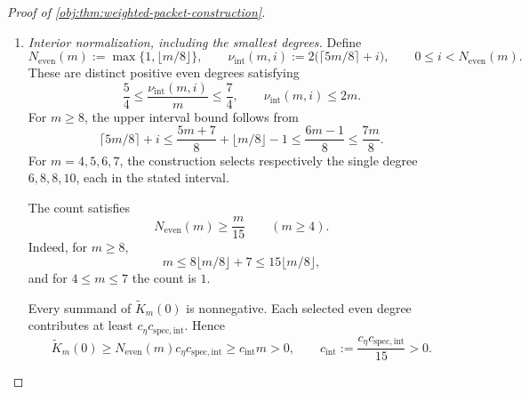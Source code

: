 \documentclass[11pt]{article}
\begin{document}
\begin{proof}[Proof of \cref{obj:thm:weighted-packet-construction}]
\begin{enumerate}
The binomial representation in \cref{obj:lem:jacobi-binomial}, evaluated at zero, gives
\[
\mathsf J_{2s}^{(4,4)}(0)
=
4^{-s}
\sum_{i=0}^{2s}
\binom{2s+4}{i}\binom{2s+4}{2s-i}(-1)^{2s-i}.
\]
The sum is the coefficient of degree \(2s\) in
\((1+z)^{2s+4}(1-z)^{2s+4}=(1-z^2)^{2s+4}\). Therefore
\[
\mathsf J_{2s}^{(4,4)}(0)
=
(-1)^s4^{-s}\binom{2s+4}{s}
\qquad(s\ge0).
\]
In particular, these even-degree center values are nonzero.

Wallis' inequality, in its finite-product form, states
\[
\prod_{i=1}^s\frac{(2i)^2}{(2i-1)(2i+1)}
=
\frac{2^{4s}(s!)^4}{((2s)!)^2(2s+1)}
\le\frac\pi2
\qquad(s\ge0).
\]
The factorial identity
\[
\frac{2^{4s}(s!)^4}{((2s)!)^2(2s+1)}
\left(4^{-s}\binom{2s}{s}\right)^2(2s+1)=1
\]
then gives, for \(s\ge1\),
\[
\left(4^{-s}\binom{2s}{s}\right)^2
\ge\frac2{\pi(2s+1)}
\ge\frac2{3\pi s}.
\]
Since \(\binom{2s+4}{s}\ge\binom{2s}{s}\),
\[
\mathsf J_{2s}^{(4,4)}(0)^2\ge\frac2{3\pi s}.
\]
Together with
\[
0<H_{2s}^{4,4}
\le\frac{C_{\mathrm{norm,int}}}{2s}
\le\frac{C_{\mathrm{norm,int}}}{s},
\]
this proves
\[
\frac{\mathsf J_{2s}^{(4,4)}(0)^2}{H_{2s}^{4,4}}
\ge c_{\mathrm{spec,int}},
\qquad
c_{\mathrm{spec,int}}
:=\frac2{3\pi C_{\mathrm{norm,int}}}>0
\qquad(s\ge1).
\]

\item \emph{Interior normalization, including the smallest degrees.}
Define
\[
N_{\mathrm{even}}(m):=\max\{1,\lfloor m/8\rfloor\},
\qquad
\nu_{\mathrm{int}}(m,i)
:=2\bigl(\lceil5m/8\rceil+i\bigr),
\qquad
0\le i<N_{\mathrm{even}}(m).
\]
These are distinct positive even degrees satisfying
\[
\frac54\le\frac{\nu_{\mathrm{int}}(m,i)}m\le\frac74,
\qquad
\nu_{\mathrm{int}}(m,i)\le2m.
\]
For \(m\ge8\), the upper interval bound follows from
\[
\lceil5m/8\rceil+i
\le\frac{5m+7}{8}+\lfloor m/8\rfloor-1
\le\frac{6m-1}{8}\le\frac{7m}{8}.
\]
For \(m=4,5,6,7\), the construction selects respectively the single degree
\(6,8,8,10\), each in the stated interval.

The count satisfies
\[
N_{\mathrm{even}}(m)\ge\frac m{15}\qquad(m\ge4).
\]
Indeed, for \(m\ge8\),
\[
m\le8\lfloor m/8\rfloor+7
\le15\lfloor m/8\rfloor,
\]
and for \(4\le m\le7\) the count is \(1\).

Every summand of \(\widetilde K_m(0)\) is nonnegative. Each selected even degree contributes at least
\(c_\eta c_{\mathrm{spec,int}}\). Hence
\[
\widetilde K_m(0)
\ge
N_{\mathrm{even}}(m)c_\eta c_{\mathrm{spec,int}}
\ge c_{\mathrm{int}}m>0,
\qquad
c_{\mathrm{int}}
:=\frac{c_\eta c_{\mathrm{spec,int}}}{15}>0.
\]


\end{enumerate}
\end{proof}
\end{document}
